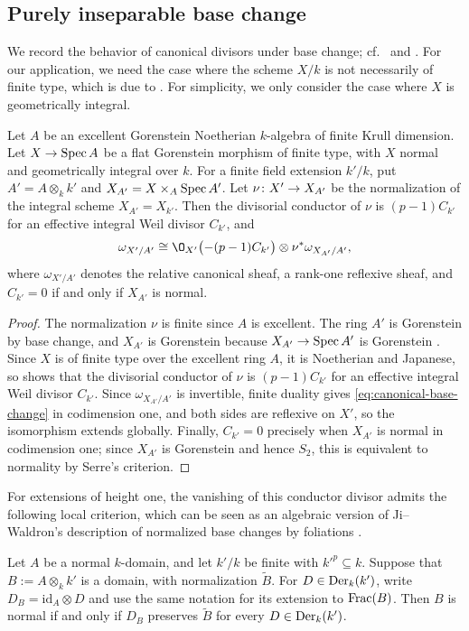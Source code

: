 \subsection{Purely inseparable base change}\label{subsec:canonical-base-change}
We record the behavior of canonical divisors under base change; cf.\ \cite{Tan18BC} and \cite[Theorems~1.1 and~1.2]{PW22}.
For our application, we need the case where the scheme $X/k$ is not necessarily of finite type, which is due to \cite{NT24}. For simplicity, we only consider the case where $X$ is geometrically integral.
\begin{lemma}\label{lem:canonical-base-change}
Let $A$ be an excellent Gorenstein Noetherian $k$-algebra of finite Krull dimension.
Let $X\to\operatorname{Spec} A$ be a flat Gorenstein morphism of finite type, with $X$ normal and geometrically integral over $k$.
For a finite field extension $k'/k$, put $A' = A\otimes_k k'$ and $X_{A'} = X\times_A\operatorname{Spec} A'$.
Let $\nu\colon X'\to X_{A'}$ be the normalization of the integral scheme $X_{A'} = X_{k'}$.
Then the divisorial conductor of $\nu$ is $(p-1)C_{k'}$ for an effective integral Weil divisor $C_{k'}$, and
\begin{equation}\label{eq:canonical-base-change}
  \omega_{X'/A'}\cong\O_{X'}\bigl(-(p-1)C_{k'}\bigr)\otimes\nu^*\omega_{X_{A'}/A'},
\end{equation}
where $\omega_{X'/A'}$ denotes the relative canonical sheaf, a rank-one reflexive sheaf, and $C_{k'} = 0$ if and only if $X_{A'}$ is normal.
\end{lemma}

\begin{proof}
The normalization $\nu$ is finite since $A$ is excellent.
The ring $A'$ is Gorenstein by base change, and $X_{A'}$ is Gorenstein because $X_{A'}\to\operatorname{Spec} A'$ is Gorenstein \cite[Tags~ and~]{Stacks}.
Since $X$ is of finite type over the excellent ring $A$, it is Noetherian and Japanese, so \cite[Corollary~5.10]{NT24} shows that the divisorial conductor of $\nu$ is $(p-1)C_{k'}$ for an effective integral Weil divisor $C_{k'}$.
Since $\omega_{X_{A'}/A'}$ is invertible, finite duality gives \eqref{eq:canonical-base-change} in codimension one, and both sides are reflexive on $X'$, so the isomorphism extends globally.
Finally, $C_{k'} = 0$ precisely when $X_{A'}$ is normal in codimension one; since $X_{A'}$ is Gorenstein and hence $S_2$, this is equivalent to normality by Serre's criterion.
\end{proof}

For extensions of height one, the vanishing of this conductor divisor admits the following local criterion, which can be seen as an algebraic version of Ji--Waldron's description of normalized base changes by foliations \cite[Sections~3 and~4]{JW21}.
\begin{lemma}\label{lem:normality-derivation}
Let $A$ be a normal $k$-domain, and let $k'/k$ be finite with $k'^p\subseteq k$.
Suppose that $B := A\otimes_k k'$ is a domain, with normalization $\widetilde B$.
For $D\in\operatorname{Der}_k(k')$, write $D_B = \mathrm{id}_A\otimes D$ and use the same notation for its extension to $\operatorname{Frac}(B)$.
Then $B$ is normal if and only if $D_B$ preserves $\widetilde B$ for every $D\in\operatorname{Der}_k(k')$.
\end{lemma}

